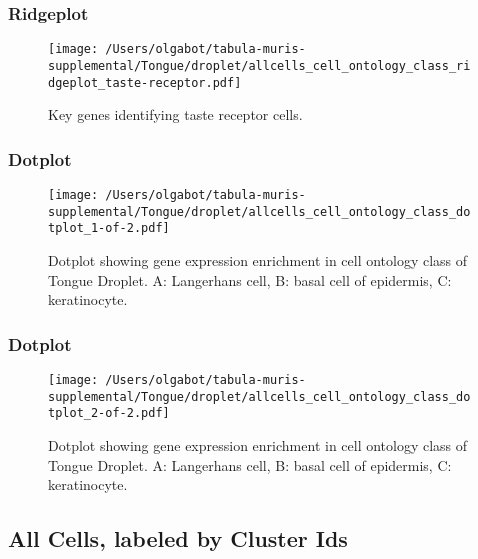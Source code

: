 \newpage
\newpage
\subsubsection{Ridgeplot}
\begin{figure}[h]
\centering
\texttt{[image: /Users/olgabot/tabula-muris-supplemental/Tongue/droplet/allcells\_cell\_ontology\_class\_ridgeplot\_taste-receptor.pdf]}

\caption{Key genes identifying taste receptor cells.
}
\end{figure}


\newpage
\newpage
\subsubsection{Dotplot}
\begin{figure}[h]
\centering
\texttt{[image: /Users/olgabot/tabula-muris-supplemental/Tongue/droplet/allcells\_cell\_ontology\_class\_dotplot\_1-of-2.pdf]}

\caption{ Dotplot  showing gene expression enrichment in cell ontology class of Tongue Droplet. A: Langerhans cell, B: basal cell of epidermis, C: keratinocyte.}
\end{figure}


\newpage
\newpage
\subsubsection{Dotplot}
\begin{figure}[h]
\centering
\texttt{[image: /Users/olgabot/tabula-muris-supplemental/Tongue/droplet/allcells\_cell\_ontology\_class\_dotplot\_2-of-2.pdf]}

\caption{ Dotplot  showing gene expression enrichment in cell ontology class of Tongue Droplet. A: Langerhans cell, B: basal cell of epidermis, C: keratinocyte.}
\end{figure}


\newpage
\subsection{All Cells, labeled by Cluster Ids}
